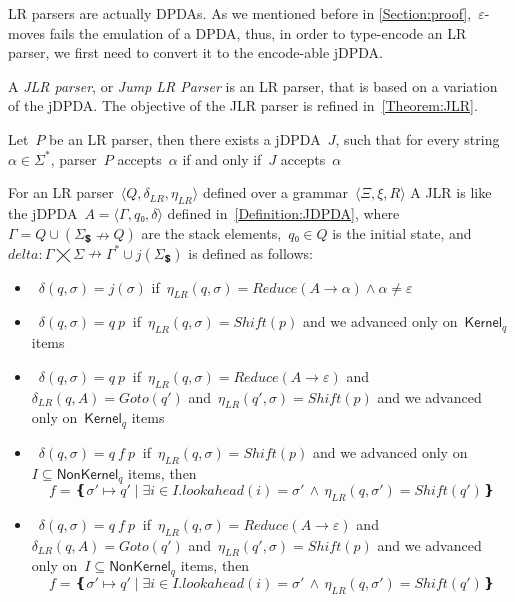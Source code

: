 LR parsers are actually DPDAs\@. As we mentioned before in \cref{Section:proof},~$ε$-moves
  fails the emulation of a DPDA, thus, in order to type-encode an LR parser, we first need
  to convert it to the encode-able jDPDA\@.

A \emph{JLR parser}, or \emph{Jump LR Parser} is an LR parser, that
  is based on a variation of the jDPDA\@.
The objective of the JLR parser is refined in~\cref{Theorem:JLR}.

\begin{Theorem}
  \label{Theorem:JLR}
  Let~$P$ be an LR parser, then there exists a jDPDA~$J$,
  such that for every string~$α∈Σ^*$, parser~$P$ accepts~$α$
    if and only if~$J$ accepts~$α$
\end{Theorem}

For an LR parser~$⟨Q,δ_{LR}, η_{LR}⟩$ defined over a grammar~$⟨Ξ,ξ,R⟩$
A JLR is like the jDPDA~$A=⟨Γ,q₀,δ⟩$ defined in~\cref{Definition:JDPDA},
  where~$Γ= Q∪(Σ_💲↛Q)$ are the stack elements,~$q₀∈Q$
  is the initial state, and~$delta:Γ⨉Σ↛Γ^*∪j(Σ_💲)$ is defined as follows:
  \begin{itemize}
   \item~$δ(q,σ)= j(σ)$ if~$η_{LR}(q,σ)=Reduce(A→α)∧α≠ε$


   \item~$δ(q,σ)= q \: p~$ if~$η_{LR}(q,σ)=Shift(p)$ and we advanced only on~$\textsf{Kernel}_q$ items
   \item~$δ(q,σ)= q \: p~$ if~$η_{LR}(q,σ)=Reduce(A→ε)$
     and~$δ_{LR}(q,A)=Goto(q')$ and~$η_{LR}(q',σ)=Shift(p)$
     and we advanced only on~$\textsf{Kernel}_q$ items


   \item~$δ(q,σ)= q \: f \: p~$ if~$η_{LR}(q,σ)=Shift(p)$ and we advanced only on~$I⊆\textsf{NonKernel}_q$
     items, then
    \[
      f = ❴σ'↦q' \; | \;∃i∈I. lookahead(i)=σ' \,∧\, η_{LR}(q,σ')=Shift(q')❵
    \]

   \item~$δ(q,σ)= q \: f \: p~$ if~$η_{LR}(q,σ)=Reduce(A→ε)$
     and~$δ_{LR}(q,A)=Goto(q')$ and~$η_{LR}(q',σ)=Shift(p)$
     and we advanced only on~$I⊆\textsf{NonKernel}_q$
     items, then
     \[
      f = ❴σ'↦q' \; | \;∃i∈I. lookahead(i)=σ' \,∧\, η_{LR}(q,σ')=Shift(q')❵
     \]

  \end{itemize}
